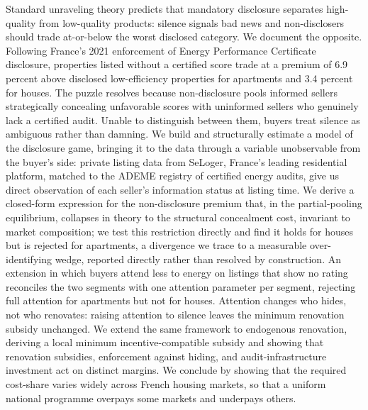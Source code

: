 Standard unraveling theory predicts that mandatory disclosure separates high-quality from low-quality products: silence signals bad news and non-disclosers should trade at-or-below the worst disclosed category. We document the opposite. Following France's 2021 enforcement of Energy Performance Certificate disclosure, properties listed without a certified score trade at a premium of 6.9 percent above disclosed low-efficiency properties for apartments and 3.4 percent for houses. The puzzle resolves because non-disclosure pools informed sellers strategically concealing unfavorable scores with uninformed sellers who genuinely lack a certified audit. Unable to distinguish between them, buyers treat silence as ambiguous rather than damning. We build and structurally estimate a model of the disclosure game, bringing it to the data through a variable unobservable from the buyer's side: private listing data from SeLoger, France's leading residential platform, matched to the ADEME registry of certified energy audits, give us direct observation of each seller's information status at listing time. We derive a closed-form expression for the non-disclosure premium that, in the partial-pooling equilibrium, collapses in theory to the structural concealment cost, invariant to market composition; we test this restriction directly and find it holds for houses but is rejected for apartments, a divergence we trace to a measurable over-identifying wedge, reported directly rather than resolved by construction. An extension in which buyers attend less to energy on listings that show no rating reconciles the two segments with one attention parameter per segment, rejecting full attention for apartments but not for houses. Attention changes who hides, not who renovates: raising attention to silence leaves the minimum renovation subsidy unchanged. %
 We extend the same framework to endogenous renovation, deriving a local minimum incentive-compatible subsidy and showing that renovation subsidies, enforcement against hiding, and audit-infrastructure investment act on distinct margins. We conclude by showing that the required cost-share varies widely across French housing markets, so that a uniform national programme overpays some markets and underpays others.
